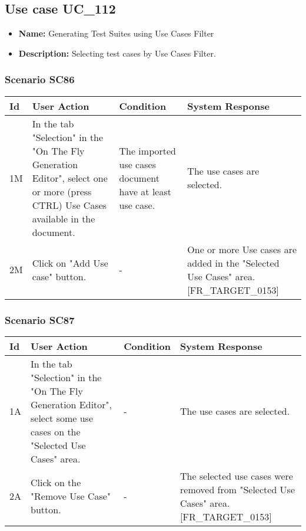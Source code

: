 \documentclass[a4paper,11pt]{article}
\newcommand{\bl}{\\ \hline}
\begin{document}
\subsection*{Use case UC_112}
\begin{itemize}
\item {\bf Name: }Generating Test Suites using Use Cases Filter
\item {\bf Description: }Selecting test cases by Use Cases Filter.
\end{itemize}
\subsubsection*{Scenario SC86}
\begin{tabular}{|p{0.4in}|p{1.5in}|p{1.5in}|p{1.5in}|}
\hline
Id & User Action & Condition & System Response \bl 
1M & In the tab "Selection" in the "On The Fly Generation
						Editor", select one or more (press CTRL) Use Cases available in
						the document.  & The imported use cases document have at least use case.
					 & The use cases are selected. \bl
2M & Click on "Add Use case" button.  & - & One or more Use cases are added in the "Selected Use
						Cases" area. [FR_TARGET_0153]\bl
\end{tabular}
\subsubsection*{Scenario SC87}
\begin{tabular}{|p{0.4in}|p{1.5in}|p{1.5in}|p{1.5in}|}
\hline
Id & User Action & Condition & System Response \bl 
1A & In the tab "Selection" in the "On The Fly Generation
						Editor", select some use cases on the "Selected Use Cases" area.
					 & - & The use cases are selected.\bl
2A & Click on the "Remove Use Case" button.  & - & The selected use cases were removed from "Selected Use
						Cases" area. [FR_TARGET_0153]\bl
\end{tabular}
\end{document}
